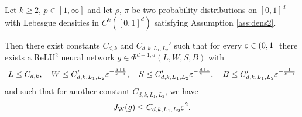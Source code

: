   \begin{theorem}\label{Thm:JBoundWasserstein}
  Let $k\ge 2$, $p\in [1,\infty]$ and let $\rho$, $\pi$ be two
  probability distributions on $[0,1]^d$ with Lebesgue densities in
  $C^k([0,1]^d)$ satisfying Assumption \ref{ass:dens2}.
  
  Then there exist constants 
  $C_{d,k}$ and $C_{d, k, L_1, L_2}'$ such that
  for every $\varepsilon\in (0,1]$
  there exists a ReLU$^2$ neural network $g\in\Phi^{d+1,d}(L, W, S, B)$ with
  \begin{equation}\label{eq:NNbounds2}
  L \leq C_{d,k},\quad
  W \leq C_{d, k, L_1, L_2}'\varepsilon^{-\frac{d+1}{k-1}},\quad
  S\leq C_{d, k, L_1, L_2}'\varepsilon^{-\frac{d+1}{k-1}},\quad
  B\leq C_{d, k, L_1,L_2}'\varepsilon^{-\frac{1}{k-1}}
\end{equation}
  and such that for another constant $C_{d,k, L_1, L_2}$, we have 
  \begin{equation*}
    J_{\rm W}(g)\le %
    C_{d,k,L_1,L_2} \eps^2.
  \end{equation*}
\end{theorem}
